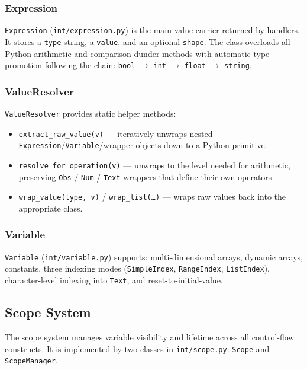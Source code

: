 \subsubsection{Expression}

\texttt{Expression} (\texttt{int/expression.py}) is the main value carrier
returned by handlers.  It stores a \texttt{type} string, a \texttt{value},
and an optional \texttt{shape}.  The class overloads all Python
arithmetic and comparison dunder methods with automatic type promotion
following the chain: \texttt{bool} $\rightarrow$ \texttt{int} $\rightarrow$
\texttt{float} $\rightarrow$ \texttt{string}.

\subsubsection{ValueResolver}

\texttt{ValueResolver} provides static helper methods:
\begin{itemize}
    \item \texttt{extract\_raw\_value(v)} --- iteratively unwraps nested
          \texttt{Expression}/\texttt{Variable}/wrapper objects down to a Python primitive.
    \item \texttt{resolve\_for\_operation(v)} --- unwraps to the level needed
          for arithmetic, preserving \texttt{Obs} / \texttt{Num} / \texttt{Text}
          wrappers that define their own operators.
    \item \texttt{wrap\_value(type, v)} / \texttt{wrap\_list(\ldots)} ---
          wraps raw values back into the appropriate class.
\end{itemize}

\subsubsection{Variable}

\texttt{Variable} (\texttt{int/variable.py}) supports:
multi-dimensional arrays, dynamic arrays,
constants, three indexing modes
(\texttt{SimpleIndex}, \texttt{RangeIndex}, \texttt{ListIndex}),
character-level indexing into \texttt{Text}, and reset-to-initial-value.

\subsection{Scope System}
\label{sec:impl-scopes}

The scope system manages variable visibility and lifetime across all
control-flow constructs.  It is implemented by two classes in
\texttt{int/scope.py}: \texttt{Scope} and \texttt{ScopeManager}.

